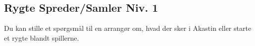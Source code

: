 \subsection*{Rygte Spreder/Samler Niv. 1}
Du kan stille et spørgsmål til en arrangør om, hvad der sker i Akastin eller starte et rygte blandt spillerne.